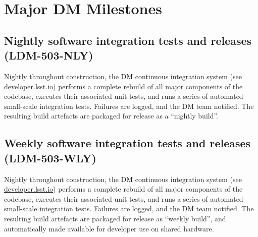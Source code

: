 








%



\section{Major DM Milestones \label{sect:milestones}}

\subsection{Nightly software integration tests and releases (LDM-503-NLY)}
\label{sect:ldm-503-nly}

Nightly throughout construction, the DM continuous integration system (see \url{developer.lsst.io}) performs a complete rebuild of all major components of the \product{} codebase, executes their associated unit tests, and runs a series of automated small-scale integration tests.
Failures are logged, and the DM team notified.
The resulting build artefacts are packaged for release as a ``nightly build''.

\subsection{Weekly software integration tests and releases (LDM-503-WLY)}
\label{sect:ldm-503-wly}

Nightly throughout construction, the DM continuous integration system (see \url{developer.lsst.io}) performs a complete rebuild of all major components of the \product{} codebase, executes their associated unit tests, and runs a series of automated small-scale integration tests.
Failures are logged, and the DM team notified.
The resulting build artefacts are packaged for release as ``weekly build'', and automatically made available for developer use on shared hardware.


